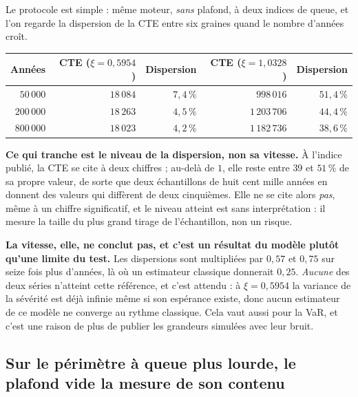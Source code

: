 Le protocole est simple : même moteur, \emph{sans} plafond, à deux indices de queue, et l'on
regarde la dispersion de la CTE entre six graines quand le nombre d'années croît.

\begin{center}\footnotesize
\renewcommand{\arraystretch}{1.25}
\begin{tabular}{@{}r r r r r@{}}
\toprule
\textbf{Années} & \textbf{CTE ($\xi=0{,}5954$)} & \textbf{Dispersion} & \textbf{CTE ($\xi=1{,}0328$)} & \textbf{Dispersion} \\
\midrule
$50\,000$ & $18\,084$ & $7{,}4\,\%$ & $998\,016$ & $51{,}4\,\%$ \\
$200\,000$ & $18\,263$ & $4{,}5\,\%$ & $1\,203\,706$ & $44{,}4\,\%$ \\
$800\,000$ & $18\,023$ & $4{,}2\,\%$ & $1\,182\,736$ & $38{,}6\,\%$ \\
\bottomrule
\end{tabular}
\end{center}

\vspace{4pt}
\noindent \textbf{Ce qui tranche est le niveau de la dispersion, non sa vitesse.} À l'indice
publié, la CTE se cite à deux chiffres ; au-delà de $1$, elle reste entre $39$ et $51\,\%$ de sa
propre valeur, de sorte que deux échantillons de huit cent mille années en donnent des valeurs
qui diffèrent de deux cinquièmes. Elle ne se cite alors \emph{pas}, même à un chiffre
significatif, et le niveau atteint est sans interprétation : il mesure la taille du plus grand
tirage de l'échantillon, non un risque.

\begin{attention}
\textbf{La vitesse, elle, ne conclut pas, et c'est un résultat du modèle plutôt qu'une limite du
test.} Les dispersions sont multipliées par $0{,}57$ et $0{,}75$ sur seize fois plus d'années, là
où un estimateur classique donnerait $0{,}25$. \emph{Aucune} des deux séries n'atteint cette
référence, et c'est attendu : à $\xi = 0{,}5954$ la variance de la sévérité est déjà
infinie même si son espérance existe, donc aucun estimateur de ce modèle ne converge au rythme
classique. Cela vaut aussi pour la VaR, et c'est une raison de plus de publier les grandeurs
simulées avec leur bruit.
\end{attention}

\subsection*{Sur le périmètre à queue plus lourde, le plafond vide la mesure de son contenu}

